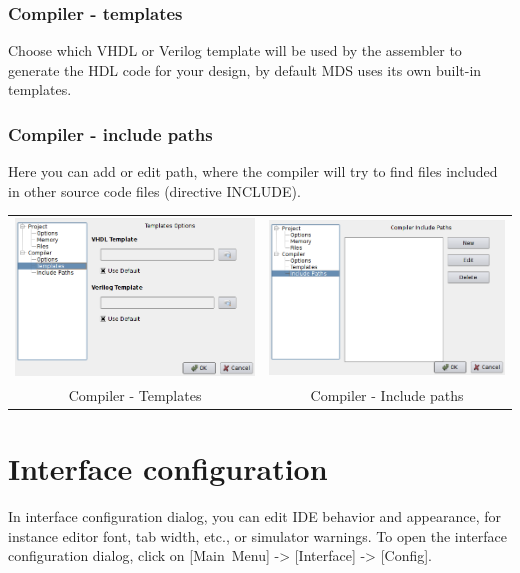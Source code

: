         \subsubsection{Compiler - templates}
            Choose which VHDL or Verilog template will be used by the assembler to generate the HDL code for your
            design, by default MDS uses its own built-in templates.

        \subsubsection{Compiler - include paths}
            Here you can add or edit path, where the compiler will try to find files included in other source code files
            (directive INCLUDE).

        \begin{table}[h!]
            \begin{tabular}{cc}
                \includegraphics[width=.5\textwidth]{img/config5.png}
                    &
                \includegraphics[width=.5\textwidth]{img/config6.png}
                    \\
                Compiler - Templates & Compiler - Include paths
            \end{tabular}
            \end{table}

\clearpage
\section{Interface configuration}
    In interface configuration dialog, you can edit IDE behavior and appearance, for instance editor font, tab width,
    etc., or simulator warnings. To open the interface configuration dialog, click on [Main~Menu] -> [Interface] ->
    [Config].

